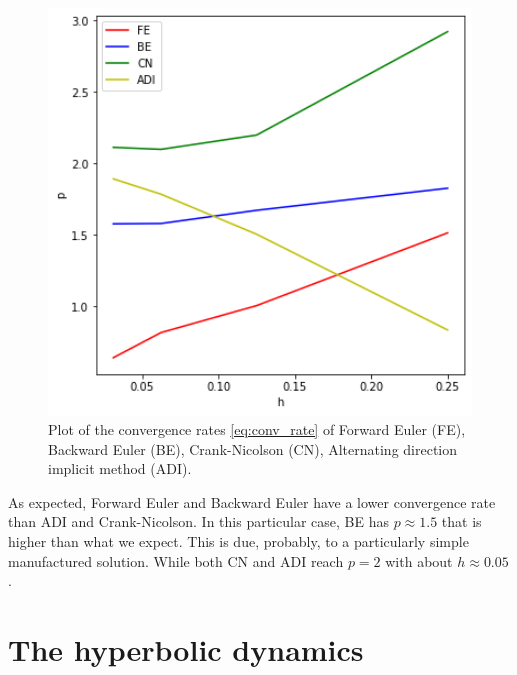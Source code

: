 \begin{figure}[H]
\noindent \centering{}\includegraphics[width=1\textwidth]{immagini/validation_r}\caption{\label{fig:Conv_rate_par}Plot of the convergence rates \ref{eq:conv_rate}
of Forward Euler (FE), Backward Euler (BE), Crank-Nicolson (CN), Alternating
direction implicit method (ADI).}
\end{figure}
As expected, Forward Euler and Backward Euler have a lower convergence
rate than ADI and Crank-Nicolson. In this particular case, BE has
$p\approx1.5$ that is higher than what we expect. This is due, probably,
to a particularly simple manufactured solution. While both CN and
ADI reach $p=2$ with about $h\approx0.05$.

\section{The hyperbolic dynamics\label{sec:Hyperbolic-dynamic}}

